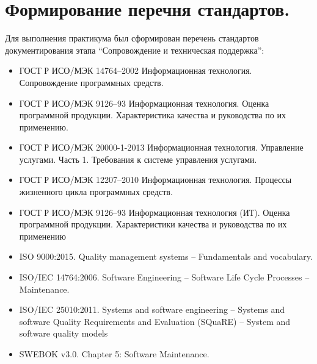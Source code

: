 
\pagebreak


\section{Формирование перечня стандартов.}

Для выполнения практикума был сформирован перечень стандартов документирования этапа \enquote{Сопровождение и техническая поддержка}:

\begin{itemize}
    \item ГОСТ Р ИСО/МЭК 14764--2002 Информационная технология.
    Сопровождение программных средств.

    \item ГОСТ Р ИСО/МЭК 9126--93 Информационная технология.
    Оценка программной продукции.
    Характеристика качества и руководства по их применению.

    \item ГОСТ Р ИСО/МЭК 20000-1-2013 Информационная технология.
    Управление услугами.
    Часть 1.
    Требования к системе управления услугами.

    \item ГОСТ Р ИСО/МЭК 12207--2010 Информационная технология.
    Процессы жизненного цикла программных средств.

    \item ГОСТ Р ИСО/МЭК 9126--93 Информационная технология (ИТ).
    Оценка программной продукции.
    Характеристики качества и руководства по их применению

    \item ISO 9000:2015.
    Quality management systems -- Fundamentals and vocabulary.

    \item ISO/IEC 14764:2006.
    Software Engineering -- Software Life Cycle Processes -- Maintenance.

    \item ISO/IEC 25010:2011.
    Systems and software engineering --
    Systems and software Quality Requirements and Evaluation (SQuaRE) --
    System and software quality models

    \item SWEBOK v3.0.
    Chapter 5: Software Maintenance.
\end{itemize}

